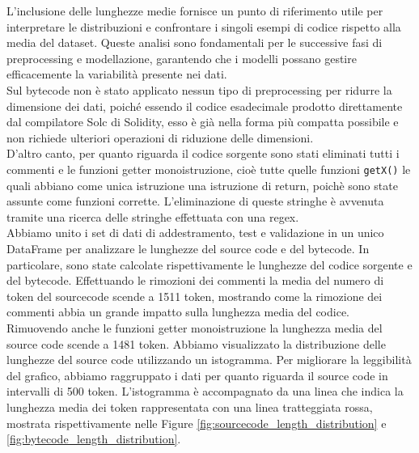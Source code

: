 \documentclass[../../Thesis.tex]{subfiles}
\begin{document}
L'inclusione delle lunghezze medie fornisce un punto di riferimento utile per interpretare le distribuzioni e confrontare i singoli esempi di codice rispetto alla media del dataset. Queste analisi sono fondamentali per le successive fasi di preprocessing e modellazione, garantendo che i modelli possano gestire efficacemente la variabilità presente nei dati.\\
Sul bytecode non è stato applicato nessun tipo di preprocessing per ridurre la dimensione dei dati, poiché essendo il codice esadecimale prodotto direttamente dal compilatore Solc di Solidity, esso è già nella forma più compatta possibile e non richiede ulteriori operazioni di riduzione delle dimensioni.\\
D'altro canto, per quanto riguarda il codice sorgente sono stati eliminati tutti i commenti e le funzioni getter monoistruzione, cioè tutte quelle funzioni \texttt{getX()} le quali abbiano come unica istruzione una istruzione di return, poichè sono state assunte come funzioni corrette. L'eliminazione di queste stringhe è avvenuta tramite una ricerca delle stringhe effettuata con una regex.\\
Abbiamo unito i set di dati di addestramento, test e validazione in un unico DataFrame per analizzare le lunghezze del source code e del bytecode. In particolare, sono state calcolate rispettivamente le lunghezze del codice sorgente e del bytecode. Effettuando le rimozioni dei commenti la media del numero di token del sourcecode scende a 1511 token, mostrando come la rimozione dei commenti abbia un grande impatto sulla lunghezza media del codice. Rimuovendo anche le funzioni getter monoistruzione la lunghezza media del source code scende a 1481 token. Abbiamo visualizzato la distribuzione delle lunghezze del source code utilizzando un istogramma. Per migliorare la leggibilità del grafico, abbiamo raggruppato i dati per quanto riguarda il source code in intervalli di 500 token. L'istogramma è accompagnato da una linea che indica la lunghezza media dei token rappresentata con una linea tratteggiata rossa, mostrata rispettivamente nelle Figure \ref{fig:sourcecode_length_distribution} e \ref{fig:bytecode_length_distribution}.\\
\end{document}
